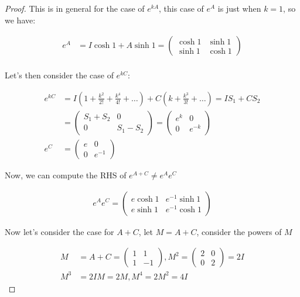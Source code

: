 \documentclass{article}
\begin{document}
\begin{proof}
This is in general for the case of $e^{kA}$, this case of $e^A$ is just when $k=1$, so we have:

\begin{align*}
e^A &= I \cosh 1 + A \sinh 1 = \begin{pmatrix}
\cosh 1 & \sinh 1 \\ \sinh 1 & \cosh 1
\end{pmatrix} \\
\end{align*}

Let's then consider the case of $e^{kC}$:

\begin{align*}
e^{kC} &= I (1 + \frac{k^2}{2!} + \frac{k^4}{4!} + \ldots )+ C (k + \frac{k^3}{3!} + \ldots ) 
= I S_1 + C S_2 \\ &= \begin{pmatrix}
S_1 + S_2 & 0 \\ 0 & S_1 - S_2
\end{pmatrix} = \begin{pmatrix}
e^{k} & 0 \\ 0 & e^{-k}
\end{pmatrix} \\
e^C &= \begin{pmatrix}
e & 0 \\ 0 & e^{-1}
\end{pmatrix}
\end{align*}

Now, we can compute the RHS of $e^{A+C} \neq e^{A}e^{C}$

\begin{align*}
e^{A}e^{C} = \begin{pmatrix}
e \cosh 1 & e^{-1} \sinh 1 \\ e \sinh 1 & e^{-1} \cosh 1
\end{pmatrix}
\end{align*} 

Now let's consider the case for $A+C$, let $M = A+C$, consider the powers of $M$

\begin{align*}
M &= A+C = \begin{pmatrix}
1 & 1 \\ 1 & -1
\end{pmatrix}, 
M^2 = \begin{pmatrix}
2 & 0 \\ 0 & 2
\end{pmatrix}  = 2I \\
M^3 &= 2IM = 2M,
M^4 = 2M^2 = 4I 
\end{align*}


\end{proof}
\end{document}
